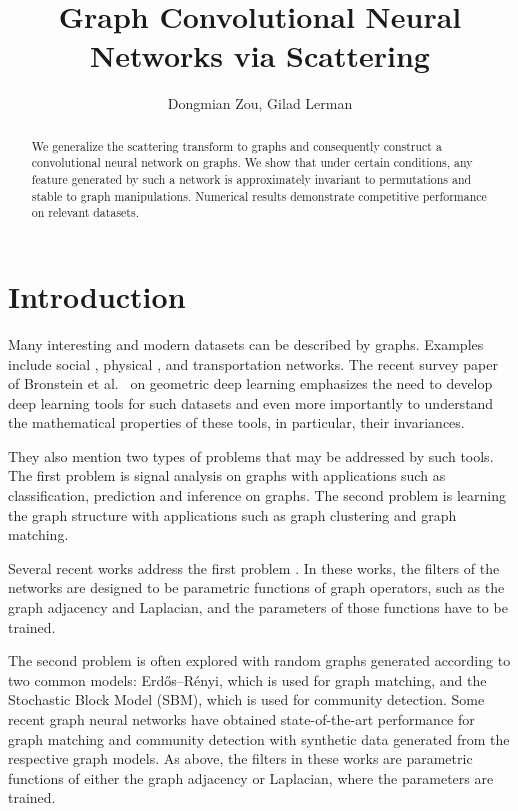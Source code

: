 \documentclass{article}
\title{Graph Convolutional Neural Networks via Scattering}
\author{Dongmian Zou, Gilad Lerman}
\begin{document}
\maketitle

\begin{abstract}
We  generalize the scattering transform to graphs and consequently construct a convolutional neural network on graphs. We show that under certain conditions, any feature generated by such a network is approximately invariant to permutations and stable to graph manipulations. Numerical results demonstrate competitive performance on relevant datasets.
\end{abstract}


\section{Introduction}\label{sec:intro}
Many interesting and modern datasets can be described by graphs. Examples include social \cite{LazPA09}, physical \cite{MasBB15}, and transportation \cite{ShuRV16} networks. The recent survey paper of Bronstein et al.~\cite{BroBL16} on geometric deep learning emphasizes the need to develop deep learning tools for such datasets and even more importantly to understand the mathematical properties of these tools, in particular, their invariances.

They also mention two types of problems that may be addressed by such tools. The first problem is signal analysis on graphs with applications such as classification, prediction and inference on graphs. The second problem is learning the graph structure with applications such as graph clustering and graph matching. 

Several recent works address the first problem \cite{BruZS13,EdwX16,DefBV16,HecCQ17}. In these works, the filters of the networks are designed to be parametric functions of graph operators, such as the graph adjacency and Laplacian, and the parameters of those functions have to be trained. 

The second problem is often explored with random graphs generated according to two common models: Erd{\H{o}}s--R{\'e}nyi, which is used for graph matching, and the Stochastic Block Model (SBM), which is used for community detection. Some recent graph neural networks have obtained state-of-the-art performance for graph matching \cite{NowVB17} and community detection \cite{BruL17,KipW16} with synthetic data generated from  the respective graph models. As above, the filters in these works are parametric functions of either the graph adjacency or Laplacian, where the parameters are trained. 
\end{document}
